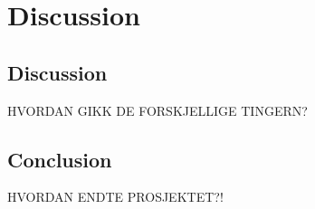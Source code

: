 \chapter{Discussion}
  \section{Discussion}
  HVORDAN GIKK DE FORSKJELLIGE TINGERN?
  \section{Conclusion}
  HVORDAN ENDTE PROSJEKTET?!